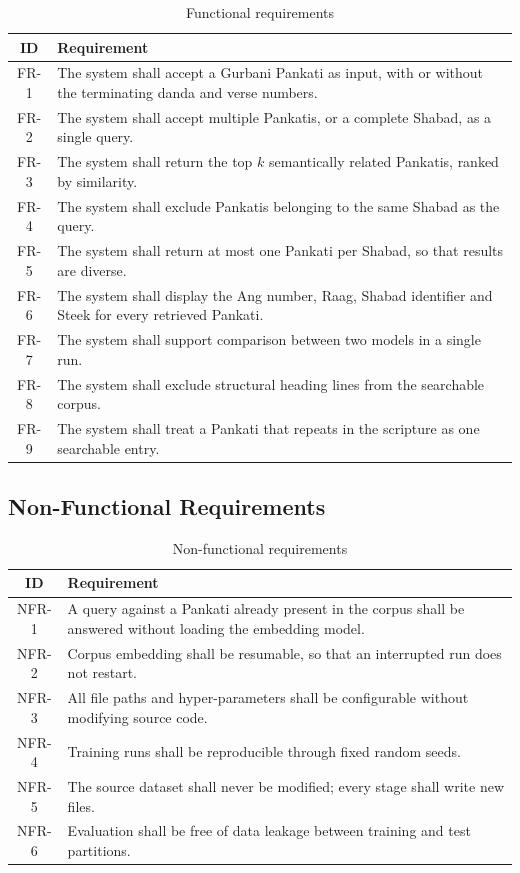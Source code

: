 \documentclass[12pt,a4paper]{article}
\begin{document}
\begin{table}[H]
\centering
\renewcommand{\arraystretch}{1.3}
\caption{Functional requirements}
\begin{tabular}{|c|p{11.2cm}|}
\hline
\textbf{ID} & \textbf{Requirement} \\
\hline
FR-1 & The system shall accept a Gurbani Pankati as input, with or without the terminating danda and verse numbers. \\
\hline
FR-2 & The system shall accept multiple Pankatis, or a complete Shabad, as a single query. \\
\hline
FR-3 & The system shall return the top $k$ semantically related Pankatis, ranked by similarity. \\
\hline
FR-4 & The system shall exclude Pankatis belonging to the same Shabad as the query. \\
\hline
FR-5 & The system shall return at most one Pankati per Shabad, so that results are diverse. \\
\hline
FR-6 & The system shall display the Ang number, Raag, Shabad identifier and Steek for every retrieved Pankati. \\
\hline
FR-7 & The system shall support comparison between two models in a single run. \\
\hline
FR-8 & The system shall exclude structural heading lines from the searchable corpus. \\
\hline
FR-9 & The system shall treat a Pankati that repeats in the scripture as one searchable entry. \\
\hline
\end{tabular}
\end{table}

\subsection{Non-Functional Requirements}

\begin{table}[H]
\centering
\renewcommand{\arraystretch}{1.3}
\caption{Non-functional requirements}
\begin{tabular}{|c|p{11.2cm}|}
\hline
\textbf{ID} & \textbf{Requirement} \\
\hline
NFR-1 & A query against a Pankati already present in the corpus shall be answered without loading the embedding model. \\
\hline
NFR-2 & Corpus embedding shall be resumable, so that an interrupted run does not restart. \\
\hline
NFR-3 & All file paths and hyper-parameters shall be configurable without modifying source code. \\
\hline
NFR-4 & Training runs shall be reproducible through fixed random seeds. \\
\hline
NFR-5 & The source dataset shall never be modified; every stage shall write new files. \\
\hline
NFR-6 & Evaluation shall be free of data leakage between training and test partitions. \\
\hline
\end{tabular}
\end{table}
\end{document}
